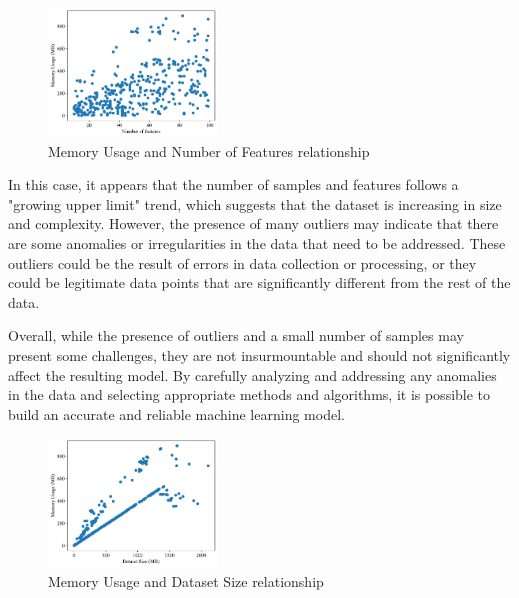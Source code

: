 \documentclass[conference]{IEEEtran}
\begin{document}
\begin{figure}[h]
    \centering
\includegraphics[width=0.4\textwidth]{plots/experiment_results/random_forest_memory_features.pdf}
    \caption{Memory Usage and Number of Features relationship}
\end{figure}


In this case, it appears that the number of samples and features follows a "growing upper limit" trend, which suggests that the dataset is increasing in size and complexity. However, the presence of many outliers may indicate that there are some anomalies or irregularities in the data that need to be addressed. These outliers could be the result of errors in data collection or processing, or they could be legitimate data points that are significantly different from the rest of the data.

Overall, while the presence of outliers and a small number of samples may present some challenges, they are not insurmountable and should not significantly affect the resulting model. By carefully analyzing and addressing any anomalies in the data and selecting appropriate methods and algorithms, it is possible to build an accurate and reliable machine learning model.





\begin{figure}[!h]
    \centering
\includegraphics[width=0.4\textwidth]{plots/experiment_results/random_forest_memory_dataset_size.pdf}
    \caption{Memory Usage and Dataset Size relationship}
\end{figure}
\end{document}

